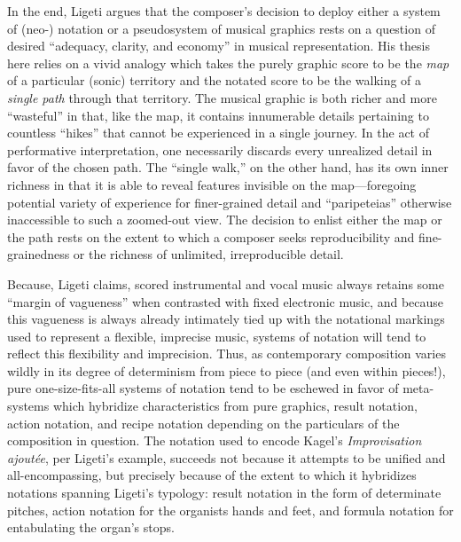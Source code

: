 In the end, Ligeti argues that the composer's decision to deploy either a system of (neo-) notation or a pseudosystem of musical graphics rests on a question of desired ``adequacy, clarity, and economy'' in musical representation. His thesis here relies on a vivid analogy which takes the purely graphic score to be the \textit{map} of a particular (sonic) territory and the notated score to be the walking of a \textit{single path} through that territory. The musical graphic is both richer and more ``wasteful'' in that, like the map, it contains innumerable details pertaining to countless ``hikes'' that cannot be experienced in a single journey. In the act of performative interpretation, one necessarily discards every unrealized detail in favor of the chosen path. The ``single walk,'' on the other hand, has its own inner richness in that it is able to reveal features invisible on the map---foregoing potential variety of experience for finer-grained detail and ``paripeteias'' otherwise inaccessible to such a zoomed-out view. The decision to enlist either the map or the path rests on the extent to which a composer seeks reproducibility and fine-grainedness or the richness of unlimited, irreproducible detail.\autocite[178]{Ligeti_1965}

Because, Ligeti  claims, scored instrumental and vocal music always retains some ``margin of vagueness'' when contrasted with fixed electronic music, and because this vagueness is always already intimately tied up with the notational markings used to represent a flexible, imprecise music, systems of notation will tend to reflect this flexibility and imprecision. Thus, as contemporary composition varies wildly in its degree of determinism from piece to piece (and even within pieces!), pure one-size-fits-all systems of notation tend to be eschewed in favor of meta-systems which hybridize characteristics from pure graphics, result notation, action notation, and recipe notation depending on the particulars of the composition in question. The notation used to encode Kagel's \textit{Improvisation ajoutée}, per Ligeti's example, succeeds not because it attempts to be unified and all-encompassing, but precisely because of the extent to which it hybridizes notations spanning Ligeti's typology: result notation in the form of determinate pitches, action notation for the organists hands and feet, and formula notation for entabulating the organ's stops.\autocite[180]{Ligeti_1965}


